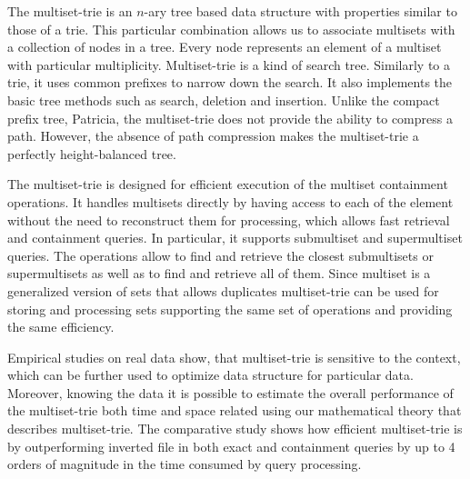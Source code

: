 The multiset-trie is an $n$-ary tree based data structure with properties similar to those of a trie. 
This particular combination allows us to associate multisets with a collection of nodes in a tree. 
Every node represents an element of a multiset with particular multiplicity. 
%
Multiset-trie is a kind of search tree. Similarly to a trie, it uses common prefixes 
to narrow down the search. It also implements the basic tree methods such as 
search, deletion and insertion. Unlike the compact prefix tree, Patricia, the multiset-trie 
does not provide the ability to compress a path. However, the absence of path 
compression makes the multiset-trie a perfectly height-balanced tree.

The multiset-trie is designed for efficient execution of the multiset containment 
operations. It handles multisets directly by having access to each of the element 
without the need to reconstruct them for processing, which allows fast retrieval and 
containment queries. In particular, it supports submultiset and supermultiset queries.
The operations allow to find and retrieve the closest submultisets or supermultisets 
as well as to find and retrieve all of them.
%
Since multiset is a generalized version of sets that allows duplicates multiset-trie can be 
used for storing and processing sets supporting the same set of operations and providing 
the same efficiency.


Empirical studies on real data show, that multiset-trie is sensitive to the context, which can 
be further used to optimize data structure for particular data. Moreover, knowing the data 
it is possible to estimate the overall performance of the multiset-trie both time and space 
related using our mathematical theory that describes multiset-trie.
%
The comparative study shows how efficient multiset-trie is by outperforming inverted file in 
both exact and containment queries by up to 4 orders of magnitude in the time consumed by 
query processing. 



